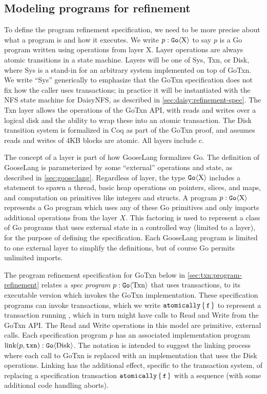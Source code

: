 \subsection{Modeling programs for refinement}

To define the program refinement specification, we need to be more precise about what a program is
and how it executes. We
write $p : \mathtt{Go}\langle \mathrm{X} \rangle$ to say $p$ is a Go program written using operations
from layer X.
Layer operations are always atomic transitions in a state machine. Layers will
be one of Sys, Txn, or Disk, where Sys is a
stand-in for an arbitrary system implemented on top of GoTxn. We write
``Sys'' generically to emphasize that the GoTxn specification does not fix how the
caller uses transactions; in practice it will be instantiated with the NFS state
machine for DaisyNFS, as described in \cref{sec:daisy:refinement-spec}.
The Txn layer allows the operations of the GoTxn API, with reads and writes over a logical
disk and the ability to wrap these into an atomic transaction. The
Disk transition system is formalized in Coq as part of the GoTxn proof,
and assumes reads and writes of 4KB blocks are atomic. All layers
include c.

The concept of a layer is part of how GooseLang formalizes Go. The definition of
GooseLang is parameterized by some ``external'' operations and state, as
described in \cref{sec:goose:lang}. Regardless of layer, the type
$\mathtt{Go}\langle \mathrm{X} \rangle$ includes a statement to spawn a thread, basic heap operations
on pointers, slices, and maps, and computation on primitives like integers and
structs. A program $p : \mathtt{Go}\langle \mathrm{X} \rangle$ represents a Go program which uses any
of these Go primitives and only imports additional operations from the layer
$X$. This factoring is used to represent a class of Go programs that uses
external state in a controlled way (limited to a layer), for the purpose of
defining the specification. Each GooseLang program is limited to one external
layer to simplify the definitions, but of course Go permits unlimited imports.

The program refinement specification for GoTxn below in
\cref{sec:txn:program-refinement} relates a \emph{spec program}
$p : \mathtt{Go}\langle \mathrm{Txn} \rangle$ that uses transactions, to its executable version
which invokes the GoTxn implementation. These specification programs can invoke
transactions, which we write $\atomically{\cc{f}}$ to represent a transaction
running , which in turn might have calls to Read and Write from the GoTxn
API. The Read and Write operations in this model are primitive, external calls.
Each specification program $p$ has an associated implementation program
$\mathrm{link}(p, \texttt{txn}) : \mathtt{Go}\langle \mathrm{Disk} \rangle$. The notation is intended
to suggest the linking process where each call to GoTxn is replaced with an
implementation that uses the Disk operations. Linking has the additional effect,
specific to the transaction system, of replacing a specification transaction
$\atomically{\cc{f}}$ with a sequence 
(with some additional code handling aborts).

